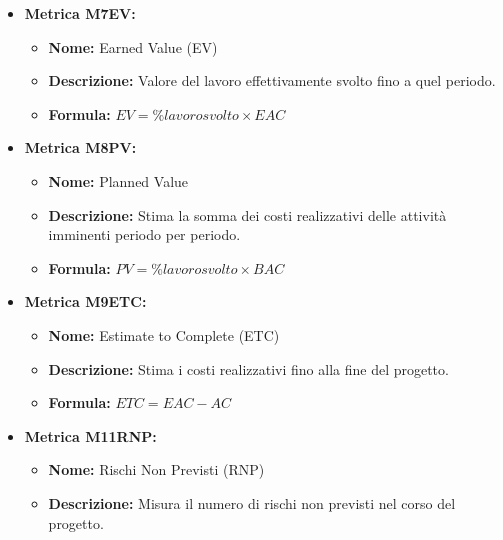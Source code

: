 \begin{itemize}
    \item \textbf{Metrica M7EV:}
          \begin{itemize}
              \item \textbf{Nome:} Earned Value (EV)
              \item \textbf{Descrizione:} Valore del lavoro effettivamente svolto fino a quel periodo.
              \item \textbf{Formula:} $EV = \% lavoro svolto \times EAC$
          \end{itemize}

    \item \textbf{Metrica M8PV:}
          \begin{itemize}
              \item \textbf{Nome:} Planned Value
              \item \textbf{Descrizione:} Stima la somma dei costi realizzativi delle attività imminenti periodo per periodo.
              \item \textbf{Formula:} $PV = \% lavoro svolto \times BAC$
          \end{itemize}

    \item \textbf{Metrica M9ETC:}
          \begin{itemize}
              \item \textbf{Nome:} Estimate to Complete (ETC)
              \item \textbf{Descrizione:} Stima i costi realizzativi fino alla fine del progetto.
              \item \textbf{Formula:} $ETC = EAC - AC$
          \end{itemize}

    \item \textbf{Metrica M11RNP:}
          \begin{itemize}
              \item \textbf{Nome:} Rischi Non Previsti (RNP)
              \item \textbf{Descrizione:} Misura il numero di rischi non previsti nel corso del progetto.
          \end{itemize}


\end{itemize}
